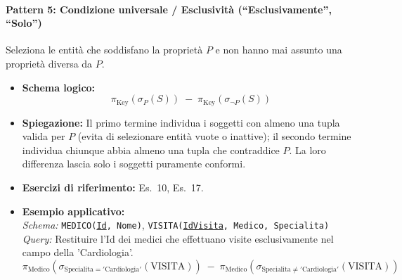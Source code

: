 \documentclass[12pt]{extarticle}
\begin{document}
\paragraph{Pattern 5: Condizione universale / Esclusività (``Esclusivamente'', ``Solo'')}
Seleziona le entità che soddisfano la proprietà $P$ e non hanno mai assunto una proprietà diversa da $P$.
\begin{itemize}
    \item \textbf{Schema logico:}
    \[
    \pi_{\text{Key}}(\sigma_{P}(S)) \;-\; \pi_{\text{Key}}(\sigma_{\neg P}(S))
    \]
    \item \textbf{Spiegazione:} Il primo termine individua i soggetti con almeno una tupla valida per $P$ (evita di selezionare entità vuote o inattive); il secondo termine individua chiunque abbia almeno una tupla che contraddice $P$. La loro differenza lascia solo i soggetti puramente conformi.
    \item \textbf{Esercizi di riferimento:} Es.~10, Es.~17.
    \item \textbf{Esempio applicativo:}\\
    \textit{Schema:} \texttt{MEDICO(\underline{Id}, Nome)}, \texttt{VISITA(\underline{IdVisita}, Medico, Specialita)}\\
    \textit{Query:} Restituire l'Id dei medici che effettuano visite esclusivamente nel campo della 'Cardiologia'.
    \[
    \pi_{\text{Medico}}(\sigma_{\text{Specialita} = '\text{Cardiologia}'}(\text{VISITA})) \;-\; \pi_{\text{Medico}}(\sigma_{\text{Specialita} \neq '\text{Cardiologia}'}(\text{VISITA}))
    \]
\end{itemize}

\end{document}
